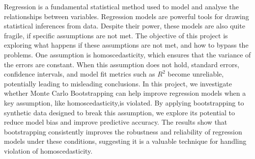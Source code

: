 Regression is a fundamental statistical method used to model and analyse the relationships between variables. Regression models are powerful tools for drawing statistical inferences from data. Despite their power, these models are also quite fragile, if specific assumptions are not met. The objective of this project is exploring what happens if these assumptions are not met, and how to bypass the problems. One assumption is homoscedasticity, which ensures that the variance of the errors are constant. When this assumption does not hold, standard errors, confidence intervals, and model fit metrics such as $R^2$ become unreliable, potentially leading to misleading conclusions. In this project, we investigate whether Monte Carlo Bootstrapping can help improve regression models when a key assumption, like homoscedasticity,is violated. By applying bootstrapping to synthetic data designed to break this assumption, we explore its potential to reduce model bias and improve predictive accuracy. The results show that bootstrapping consistently improves the robustness and reliability of regression models under these conditions, suggesting it is a valuable technique for handling  violation of homoscedasticity.